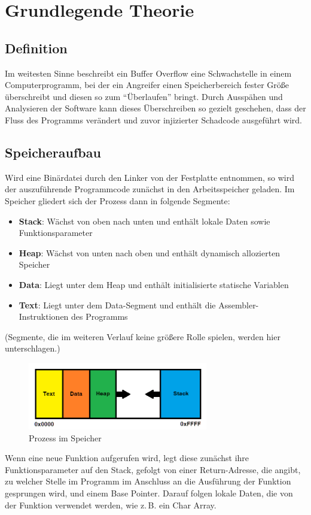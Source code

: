 \section{Grundlegende Theorie}
\subsection{Definition}
Im weitesten Sinne beschreibt ein Buffer Overflow eine Schwachstelle in einem Computerprogramm,
bei der ein Angreifer einen Speicherbereich fester Größe überschreibt und diesen so zum “Überlaufen” bringt.
Durch Ausspähen und Analysieren der Software kann dieses Überschreiben so gezielt geschehen, dass der Fluss des
Programms verändert und zuvor injizierter Schadcode ausgeführt wird. \cite{NISTSP}
\subsection{Speicheraufbau}
Wird eine Binärdatei durch den Linker von der Festplatte entnommen, so wird der auszuführende Programmcode
zunächst in den Arbeitsspeicher geladen. Im Speicher gliedert sich der Prozess dann in folgende Segmente:
\begin{itemize}
    \item \textbf{Stack}: Wächst von oben nach unten und enthält lokale Daten sowie Funktionsparameter
    \item \textbf{Heap}: Wächst von unten nach oben und enthält dynamisch allozierten Speicher
    \item \textbf{Data}: Liegt unter dem Heap und enthält initialisierte statische Variablen
    \item \textbf{Text}: Liegt unter dem Data-Segment und enthält die Assembler-Instruktionen des Programms
\end{itemize}

(Segmente, die im weiteren Verlauf keine größere Rolle spielen, werden hier unterschlagen.)
\begin{figure}[h]
    \centering
    \includegraphics[width=0.7\textwidth,height=0.75\textheight,keepaspectratio]{images/process.png}
    \caption{Prozess im Speicher}
\end{figure}
Wenn eine neue Funktion aufgerufen wird, legt diese zunächst ihre Funktionsparameter auf den Stack,
gefolgt von einer Return-Adresse, die angibt, zu welcher Stelle im Programm im Anschluss an die
Ausführung der Funktion gesprungen wird, und einem Base Pointer. Darauf folgen lokale Daten,
die von der Funktion verwendet werden, wie z.\,B. ein Char Array.
\pagebreak
